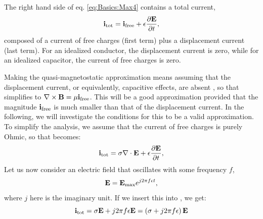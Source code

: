 
\subsection{}
\label{sec:Basics:Quasimagnetostatic} 


The right hand side of eq. \ref{eq:Basics:Max4} contains a total current,
\begin{equation}
{\bf i}_\text{tot} = {\bf i}_\text{free} + \epsilon\frac{\partial {\bf E}}{\partial t},
\label{eq:Basics:totcurrent}
\end{equation}
composed of a current of free charges (first term) plus a displacement current (last term). For an idealized conductor, the displacement current is zero, while for an idealized capacitor, the current of free charges is zero.

Making the quasi-magnetostatic approximation means assuming that the displacement current, or equivalently, capacitive effects, are absent , so that  simplifies to ${\bf \nabla} \times {\bf B}  =  \mu{\bf i}_\text{free}$. This will be a good approximation provided that the magnitude ${\bf i}_\text{free}$ is much smaller  than that of the displacement current. In the following, we will investigate the conditions for this to be a valid approximation. To simplify the analysis, we assume that the current of free charges is purely Ohmic, so that  becomes:
\begin{equation}
{\bf i}_\text{tot} = \sigma {\bf \nabla} \cdot {\bf E} + \epsilon\frac{\partial {\bf E}}{\partial t},
\label{eq:Basics:totcurrent2}
\end{equation}
Let us now consider an electric field that oscillates with some frequency $f$,
\begin{equation}
{\bf E} = {\bf E}_\text{max} e^{j2\pi f \epsilon t},
\label{eq:Basics:Ecomponent}
\end{equation}
where $j$ here is the imaginary unit. 
If we insert this into , we get:
\begin{equation}
{\bf i}_\text{tot} = \sigma{\bf E} +  j 2 \pi f \epsilon {\bf E} = \left( \sigma + j 2 \pi f \epsilon \right){\bf E}
\label{eq:Basics:totcurrent3}
\end{equation}

